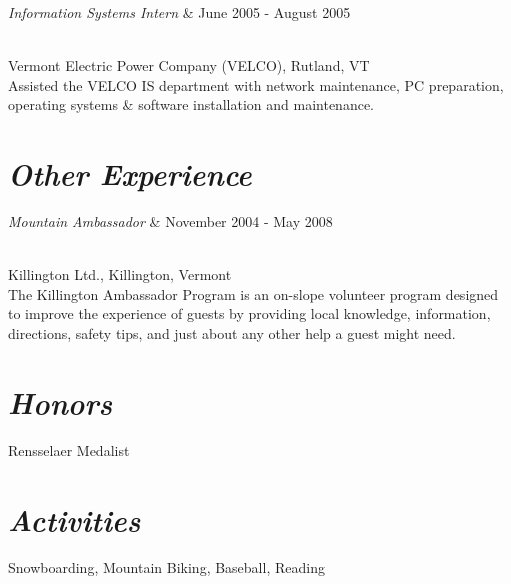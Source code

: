 \documentclass[margin]{res}
\begin{document}
\begin{resume}
\begin{ncolumn}{2}
{\it Information Systems Intern}  &   June 2005 - August 2005 
\end{ncolumn}\\
Vermont Electric Power Company (VELCO), Rutland, VT\\
Assisted the VELCO IS department with network maintenance, PC preparation, operating systems \& software installation and maintenance.

\section{\sl  Other Experience}
\begin{ncolumn}{2}
{\it Mountain Ambassador} & November 2004 - May 2008
\end{ncolumn}\\
Killington Ltd., Killington, Vermont\\
The Killington Ambassador Program is an on-slope volunteer program designed to improve the experience of guests by providing local knowledge, information, directions, safety tips, and just about any other help a guest might need.

\section{\sl  Honors}
Rensselaer Medalist
 
\section{\sl  Activities}
Snowboarding, Mountain Biking, Baseball, Reading
 
\end{resume}
\end{document}
